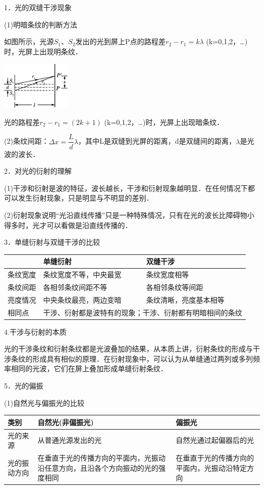 1．光的双缝干涉现象

(1)明暗条纹的判断方法

如图所示，光源$S_1$、$S_2$发出的光到屏上P点的路程差$r_2-r_1=k\lambda$
(k=0,1,2，\ldots)时，光屏上出现明条纹．

\begin{center}\includegraphics[width=1.30208in,height=0.90556in]{media/image558.png}\end{center}

光的路程差$r_2-r_1=(2k+1)$
(k=0,1,2，\ldots)时，光屏上出现暗条纹．

(2)条纹间距：$\Delta x=\dfrac{L}{d}\lambda$，其中L是双缝到光屏的距离，d是双缝间的距离，$\lambda$是光波的波长．

2．对光的衍射的理解

(1)干涉和衍射是波的特征，波长越长，干涉和衍射现象越明显．在任何情况下都可以发生衍射现象，只是明显与不明显的差别．

(2)衍射现象说明``光沿直线传播''只是一种特殊情况，只有在光的波长比障碍物小得多时，光才可以看做是沿直线传播的．

3．单缝衍射与双缝干涉的比较

\begin{longtable}[]{@{}m{2cm}m{5cm}m{5cm}@{}}
\toprule
&
单缝衍射
&
双缝干涉
\tabularnewline
\midrule
\endhead
条纹宽度
&
条纹宽度不等，中央最宽
&
条纹宽度相等
\tabularnewline
条纹间距 & 各相邻条纹间距不等 & 各相邻条纹等间距\tabularnewline
亮度情况 & 中央条纹最亮，两边变暗 &
条纹清晰，亮度基本相等\tabularnewline
相同点 &\multicolumn{2}{l}{干涉、衍射都是波特有的现象；干涉、衍射都有明暗相间的条纹}
\tabularnewline
\bottomrule
\end{longtable}

4.干涉与衍射的本质

光的干涉条纹和衍射条纹都是光波叠加的结果，从本质上讲，衍射条纹的形成与干涉条纹的形成具有相似的原理．在衍射现象中，可以认为从单缝通过两列或多列频率相同的光波，它们在屏上叠加形成单缝衍射条纹．

5．光的偏振

(1)自然光与偏振光的比较

\begin{longtable}[]{@{}m{2.2cm}m{6cm}m{4cm}@{}}
\toprule
类别 & 自然光(非偏振光) & 偏振光\tabularnewline
\midrule
\endhead
光的来源 & 从普通光源发出的光 & 自然光通过起偏器后的光\tabularnewline
光的振动方向 &
在垂直于光的传播方向的平面内，光振动沿任意方向，且沿各个方向振动的光的强度相同
& 在垂直于光的传播方向的平面内，光振动沿特定方向\tabularnewline
\bottomrule
\end{longtable}

